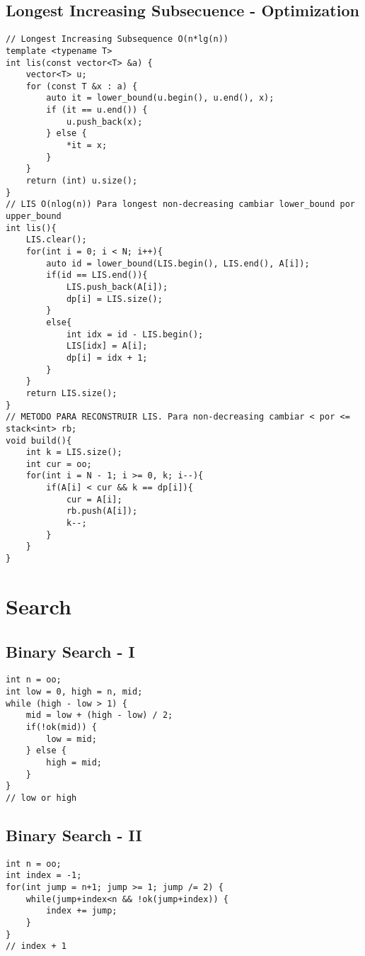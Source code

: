 \documentclass[10pt,letterpaper,twocolumn,twosided]{article}
\begin{document}
\subsection{Longest Increasing Subsecuence - Optimization}
\begin{lstlisting}
// Longest Increasing Subsequence O(n*lg(n))
template <typename T>
int lis(const vector<T> &a) {
    vector<T> u;
    for (const T &x : a) {
        auto it = lower_bound(u.begin(), u.end(), x);
        if (it == u.end()) {
            u.push_back(x);
        } else {
            *it = x;
        }
    }
    return (int) u.size();
}
// LIS O(nlog(n)) Para longest non-decreasing cambiar lower_bound por upper_bound
int lis(){
    LIS.clear();
    for(int i = 0; i < N; i++){
        auto id = lower_bound(LIS.begin(), LIS.end(), A[i]);
        if(id == LIS.end()){
            LIS.push_back(A[i]);
            dp[i] = LIS.size();
        } 
        else{
            int idx = id - LIS.begin();
            LIS[idx] = A[i];
            dp[i] = idx + 1;
        }
    }
    return LIS.size();
}
// METODO PARA RECONSTRUIR LIS. Para non-decreasing cambiar < por <=
stack<int> rb;
void build(){
    int k = LIS.size();
    int cur = oo;
    for(int i = N - 1; i >= 0, k; i--){
        if(A[i] < cur && k == dp[i]){
            cur = A[i];
            rb.push(A[i]);
            k--;
        }
    }
}
\end{lstlisting}

\section{Search}

\subsection{Binary Search - I}
\begin{lstlisting}
int n = oo;
int low = 0, high = n, mid;
while (high - low > 1) {
    mid = low + (high - low) / 2;
    if(!ok(mid)) {
        low = mid;
    } else {
        high = mid;
    }
}
// low or high
\end{lstlisting}

\subsection{Binary Search - II}
\begin{lstlisting}
int n = oo;
int index = -1;
for(int jump = n+1; jump >= 1; jump /= 2) {
    while(jump+index<n && !ok(jump+index)) {
        index += jump;
    }
}
// index + 1
\end{lstlisting}
\end{document}
